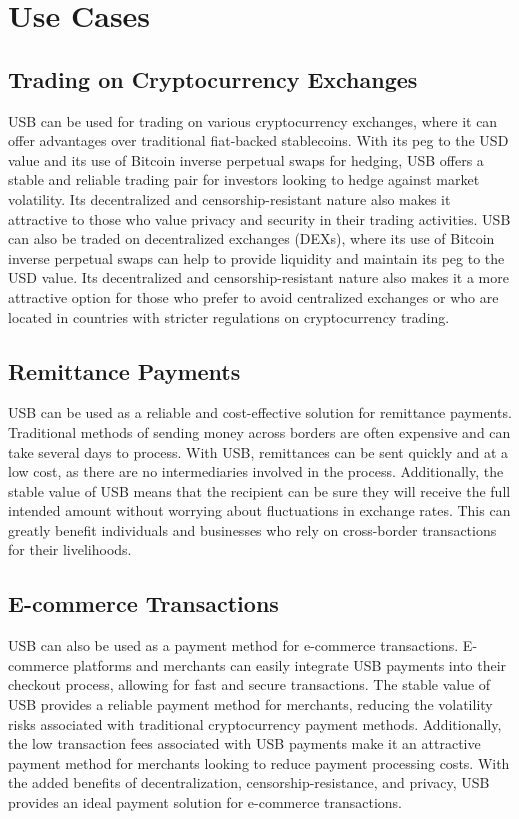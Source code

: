 
\section{Use Cases} 
\subsection{Trading on Cryptocurrency Exchanges}
USB can be used for trading on various cryptocurrency exchanges, where it can offer advantages over traditional fiat-backed stablecoins. 
With its peg to the USD value and its use of Bitcoin inverse perpetual swaps for hedging, USB offers a stable and reliable trading pair for investors looking to hedge against market volatility. 
Its decentralized and censorship-resistant nature also makes it attractive to those who value privacy and security in their trading activities.\newline
USB can also be traded on decentralized exchanges (DEXs), where its use of Bitcoin inverse perpetual swaps can help to provide liquidity and maintain its peg to the USD value. 
Its decentralized and censorship-resistant nature also makes it a more attractive option for those who prefer to avoid centralized exchanges or who are located in countries with stricter regulations on cryptocurrency trading.

\subsection{Remittance Payments}
USB can be used as a reliable and cost-effective solution for remittance payments.
Traditional methods of sending money across borders are often expensive and can take several days to process. 
With USB, remittances can be sent quickly and at a low cost, as there are no intermediaries involved in the process. 
Additionally, the stable value of USB means that the recipient can be sure they will receive the full intended amount without worrying about fluctuations in exchange rates. 
This can greatly benefit individuals and businesses who rely on cross-border transactions for their livelihoods.
\subsection{E-commerce Transactions}
USB can also be used as a payment method for e-commerce transactions.
E-commerce platforms and merchants can easily integrate USB payments into their checkout process, allowing for fast and secure transactions.
The stable value of USB provides a reliable payment method for merchants, reducing the volatility risks associated with traditional cryptocurrency payment methods. 
Additionally, the low transaction fees associated with USB payments make it an attractive payment method for merchants looking to reduce payment processing costs.
With the added benefits of decentralization, censorship-resistance, and privacy, USB provides an ideal payment solution for e-commerce transactions.

